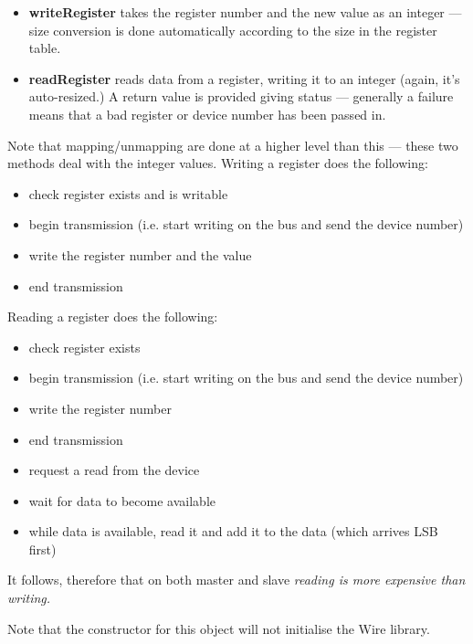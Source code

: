 \begin{itemize}
\item \textbf{writeRegister} takes the register number
and the new value as an integer --- size conversion is done automatically according
to the size in the register table.
\item \textbf{readRegister} reads data from a register, writing it
to an integer (again, it's auto-resized.) A return value
is provided giving status --- generally a failure means that
a bad register or device number has been passed in.
\end{itemize}
Note that mapping/unmapping are done at a higher level than this --- these two
methods deal with the integer values.
Writing a register does the following:
\begin{itemize}
\item check register exists and is writable
\item begin transmission (i.e. start writing on the bus and send the device number)
\item write the register number and the value
\item end transmission
\end{itemize}
Reading a register does the following:
\begin{itemize}
\item check register exists
\item begin transmission (i.e. start writing on the bus and send the device number)
\item write the register number
\item end transmission
\item request a read from the device
\item wait for data to become available
\item while data is available, read it and add it to the data (which arrives LSB first)
\end{itemize}
It follows, therefore that on both master and slave \emph{reading is more expensive than writing.} 

Note that the constructor for this object will not initialise
the Wire library.

